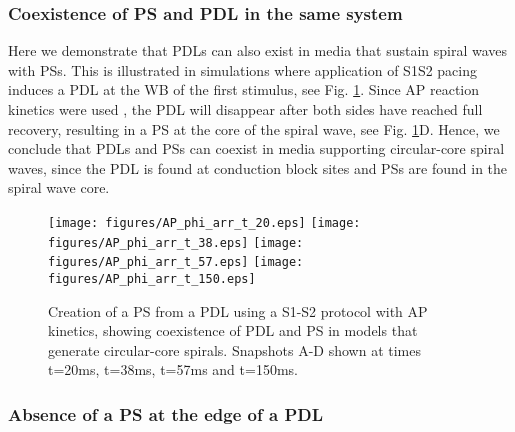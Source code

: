 \documentclass{article}
\begin{document}
\subsubsection{Coexistence of PS and PDL in the same system}

Here we demonstrate that PDLs can also exist in media that sustain spiral waves with PSs. This is illustrated in simulations where application of S1S2 pacing induces a PDL at the WB of the first stimulus, see Fig. \ref{fig:AP_spiral}. Since AP reaction kinetics were used \citep{Aliev:1996}, the PDL will disappear after both sides have reached full recovery, resulting in a PS at the core of the spiral wave, see Fig. \ref{fig:AP_spiral}D. Hence, we conclude that PDLs and PSs can coexist in media supporting circular-core spiral waves, since the PDL is found at conduction block sites and PSs are found in the spiral wave core.  


\begin{figure}
    \centering
{} 
\texttt{[image: figures/AP\_phi\_arr\_t\_20.eps]}
\texttt{[image: figures/AP\_phi\_arr\_t\_38.eps]}
\texttt{[image: figures/AP\_phi\_arr\_t\_57.eps]}
\texttt{[image: figures/AP\_phi\_arr\_t\_150.eps]}
    \caption{Creation of a PS from a PDL using a S1-S2 protocol with AP kinetics, showing coexistence of PDL and PS in models that generate circular-core spirals. Snapshots A-D shown at times t=20ms, t=38ms, t=57ms and t=150ms.  }
    \label{fig:AP_spiral}
\end{figure}


\subsubsection{Absence of a PS at the edge of a PDL}
\end{document}
